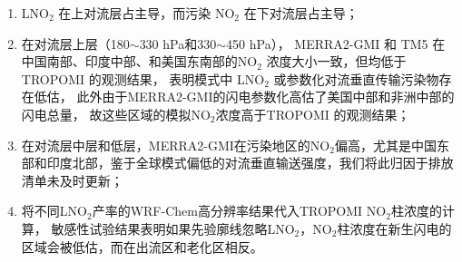 \begin{enumerate}[label=(\arabic*), labelindent=\parindent, leftmargin=0pt, widest=0, itemindent=*, topsep=0pt, partopsep=0pt, parsep=0pt]

\item LNO$_2$ 在上对流层占主导，而污染 NO$_2$ 在下对流层占主导；

\item 在对流层上层（180$\sim$330 hPa和330$\sim$450 hPa），
MERRA2-GMI 和 TM5 在中国南部、印度中部、和美国东南部的NO$_2$ 浓度大小一致，但均低于 TROPOMI 的观测结果，
表明模式中 LNO$_2$ 或参数化对流垂直传输污染物存在低估，
此外由于MERRA2-GMI的闪电参数化高估了美国中部和非洲中部的闪电总量，
故这些区域的模拟NO$_2$浓度高于TROPOMI 的观测结果；

\item 在对流层中层和低层，MERRA2-GMI在污染地区的NO$_2$偏高，尤其是中国东部和印度北部，鉴于全球模式偏低的对流垂直输送强度，我们将此归因于排放清单未及时更新；

\item 将不同LNO$_2$产率的WRF-Chem高分辨率结果代入TROPOMI NO$_2$柱浓度的计算，
敏感性试验结果表明如果先验廓线忽略LNO$_2$，NO$_2$柱浓度在新生闪电的区域会被低估，而在出流区和老化区相反。

\end{enumerate}
